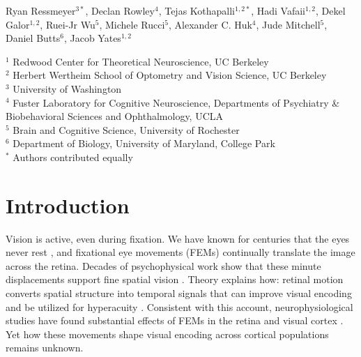 \documentclass{lite}
\begin{document}

\begin{center}
\vspace{-0.25em}
{\large Ryan Ressmeyer$^{3*}$, Declan Rowley$^{4}$, Tejas Kothapalli$^{1,2*}$, Hadi Vafaii$^{1,2}$, Dekel Galor$^{1,2}$, Ruei-Jr Wu$^{5}$, Michele Rucci$^{5}$, Alexander C. Huk$^{4}$, Jude Mitchell$^{5}$, Daniel Butts$^{6}$, Jacob Yates$^{1,2}$\par}
\vspace{0.35em}
{\small
$^{1}$ Redwood Center for Theoretical Neuroscience, UC Berkeley\\
$^{2}$ Herbert Wertheim School of Optometry and Vision Science, UC 
Berkeley\\
$^{3}$ University of Washington\\
$^{4}$ Fuster Laboratory for Cognitive Neuroscience, Departments of Psychiatry \& Biobehavioral Sciences and Ophthalmology, UCLA\\
$^{5}$ Brain and Cognitive Science, University of Rochester\\
$^{6}$ Department of Biology, University of Maryland, College Park\\
$^*$ Authors contributed equally
\par}
\vspace{1em}
\end{center}



\section{Introduction}
Vision is active, even during fixation. We have known for centuries that the eyes never rest \cite{Jurin1738, martinez2017unchanging}, and fixational eye movements (FEMs) continually translate the image across the retina. Decades of psychophysical work show that these minute displacements support fine spatial vision \cite{rucci2007miniature, ratnam2017benefits, intoy2020finely}. Theory explains how: retinal motion converts spatial structure into temporal signals that can improve visual encoding \cite{rucci2015unsteady, rucci2018temporal} and be utilized for hyperacuity \cite{anderson2020high}. Consistent with this account, neurophysiological studies have found substantial effects of FEMs in the retina \cite{wu2024fixational} and visual cortex \cite{baudot2013animation, mcfarland2016variability}. Yet how these movements shape visual encoding across cortical populations remains unknown.
\end{document}
